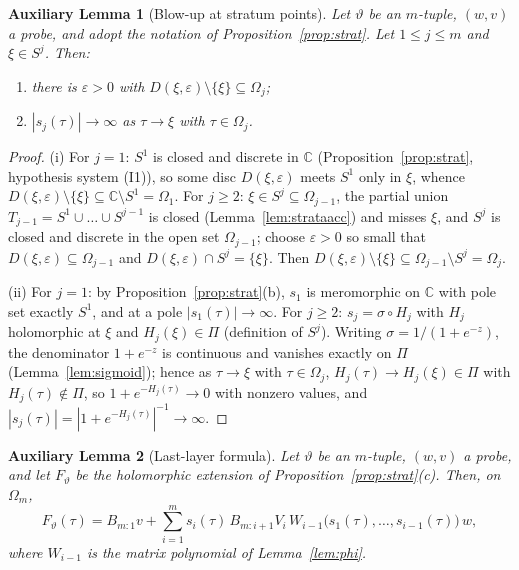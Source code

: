 \documentclass[11pt]{article}
\theoremstyle{definition}
\theoremstyle{remark}
\theoremstyle{plain}
\newtheorem{auxlemma}{Auxiliary Lemma}
\newcommand{\C}{\mathbb{C}}
\newcommand{\sig}{\sigma}
\begin{document}
\begin{auxlemma}[Blow-up at stratum points]\label{lem:stratpole}
Let $\vartheta$ be an $m$-tuple, $(w,v)$ a probe, and adopt the notation of
Proposition~\ref{prop:strat}.  Let $1\le j\le m$ and $\xi\in S^j$.  Then:
\begin{enumerate}
\item[(i)] there is $\varepsilon>0$ with
$D(\xi,\varepsilon)\setminus\{\xi\}\subseteq\Omega_j$;
\item[(ii)] $|s_j(\tau)|\to\infty$ as $\tau\to\xi$ with $\tau\in\Omega_j$.
\end{enumerate}
\end{auxlemma}

\begin{proof}
(i)  For $j=1$: $S^1$ is closed and discrete in $\C$ (Proposition~\ref{prop:strat},
hypothesis system (I1)), so some disc $D(\xi,\varepsilon)$ meets $S^1$ only in $\xi$,
whence $D(\xi,\varepsilon)\setminus\{\xi\}\subseteq\C\setminus S^1=\Omega_1$.  For
$j\ge2$: $\xi\in S^j\subseteq\Omega_{j-1}$, the partial union
$T_{j-1}=S^1\cup\dots\cup S^{j-1}$ is closed (Lemma~\ref{lem:strataacc}) and misses
$\xi$, and $S^j$ is closed and discrete in the open set $\Omega_{j-1}$; choose
$\varepsilon>0$ so small that $D(\xi,\varepsilon)\subseteq\Omega_{j-1}$ and
$D(\xi,\varepsilon)\cap S^j=\{\xi\}$.  Then
$D(\xi,\varepsilon)\setminus\{\xi\}\subseteq\Omega_{j-1}\setminus S^j=\Omega_j$.

(ii)  For $j=1$: by Proposition~\ref{prop:strat}(b), $s_1$ is meromorphic on $\C$ with
pole set exactly $S^1$, and at a pole $|s_1(\tau)|\to\infty$.  For $j\ge2$:
$s_j=\sig\circ H_j$ with $H_j$ holomorphic at $\xi$ and $H_j(\xi)\in\Pi$
(definition of $S^j$).  Writing $\sig=1/(1+e^{-z})$, the denominator $1+e^{-z}$ is
continuous and vanishes exactly on $\Pi$ (Lemma~\ref{lem:sigmoid}); hence as
$\tau\to\xi$ with $\tau\in\Omega_j$, $H_j(\tau)\to H_j(\xi)\in\Pi$ with
$H_j(\tau)\notin\Pi$, so $1+e^{-H_j(\tau)}\to0$ with nonzero values, and
$|s_j(\tau)|=|1+e^{-H_j(\tau)}|^{-1}\to\infty$.
\end{proof}

\begin{auxlemma}[Last-layer formula]\label{lem:lastlayer}
Let $\vartheta$ be an $m$-tuple, $(w,v)$ a probe, and let $F_\vartheta$ be the
holomorphic extension of Proposition~\ref{prop:strat}(c).  Then, on $\Omega_m$,
\begin{equation}\label{eq:lastlayer}
F_\vartheta(\tau)
= B_{m:1}v+\sum_{i=1}^{m}s_i(\tau)\,B_{m:i+1}V_i\,
W_{i-1}\big(s_1(\tau),\dots,s_{i-1}(\tau)\big)\,w ,
\end{equation}
where $W_{i-1}$ is the matrix polynomial of Lemma~\ref{lem:phi}.
\end{auxlemma}
\end{document}
